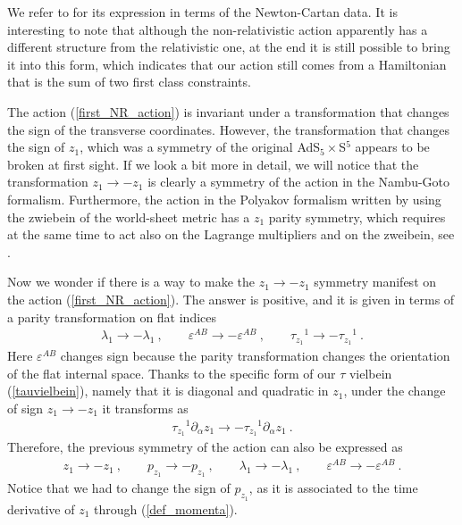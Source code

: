 \documentclass[12pt]{article}
\numberwithin{equation}{section}
\begin{document}
We refer to \cite{Kluson:2018grx} for its expression in terms of the Newton-Cartan data. It is interesting to note that although the non-relativistic action apparently has a different structure from the relativistic one, at the end it is still possible to bring it into this form, which indicates that our action still comes from a Hamiltonian that is the sum of two first class constraints.

The action (\ref{first_NR_action}) is invariant under a transformation that changes the sign of the transverse coordinates. However, the transformation that changes the sign of $z_1$, which was a symmetry of the original AdS$_5\times$S$^5$ appears to be broken at first sight. If we look a bit more in detail, we will notice that the transformation $z_1 \to -z_1$ is clearly a symmetry of the action in the Nambu-Goto formalism. Furthermore, the action in the Polyakov formalism written by using the zwiebein of the world-sheet metric has a $z_1$ parity symmetry, which requires at the same time to act also on the Lagrange multipliers and on the zweibein, see \cite{Fontanella:2021btt}.

Now we wonder if there is a way to make the $z_1 \to -z_1$ symmetry manifest on the action (\ref{first_NR_action}). The answer is positive, and it is given in terms of a parity transformation on flat indices
\begin{eqnarray}
    \lambda_1 \rightarrow -\lambda_1 \ , \qquad
    \varepsilon^{AB} \rightarrow -\varepsilon^{AB}  \ , \qquad
    \tau_{z_1}{}^1 \rightarrow -  \tau_{z_1}{}^1 \ . 
\end{eqnarray}
Here $\varepsilon^{AB}$ changes sign because the parity transformation changes the orientation of the flat internal space. Thanks to the specific form of our $\tau$ vielbein (\ref{tauvielbein}), namely that it is diagonal and quadratic in $z_1$, under the change of sign $z_1 \to -z_1$ it transforms as
\begin{eqnarray}
    \tau_{z_1}{}^1 \partial_{\alpha} z_1 \to -  \tau_{z_1}{}^1 \partial_{\alpha} z_1 \ .
\end{eqnarray}
Therefore, the previous symmetry of the action can also be expressed as 
\begin{eqnarray}
\label{Z2_symmetry}
    z_1\rightarrow -z_1 \ , \qquad
    p_{z_1} \rightarrow - p_{z_1} \ , \qquad
    \lambda_1 \rightarrow -\lambda_1 \ , \qquad
    \varepsilon^{AB} \rightarrow -\varepsilon^{AB} \ .
\end{eqnarray}
Notice that we had to change the sign of $p_{z_1}$, as it is associated to the time derivative of $z_1$ through (\ref{def_momenta}).
\end{document}
